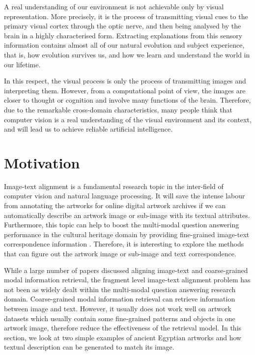 A real understanding of our environment is not achievable only by visual representation. More precisely, it is the process of transmitting visual cues to the primary visual cortex through the optic nerve, and then being analysed by the brain in a highly characterised form. Extracting explanations from this sensory information contains almost all of our natural evolution and subject experience, that is, how evolution survives us, and how we learn and understand the world in our lifetime.

In this respect, the visual process is only the process of transmitting images and interpreting them. However, from a computational point of view, the images are closer to thought or cognition and involve many functions of the brain. Therefore, due to the remarkable cross-domain characteristics, many people think that computer vision is a real understanding of the visual environment and its context, and will lead us to achieve reliable artificial intelligence.

\section{Motivation}
Image-text alignment is a fundamental research topic in the inter-field of computer vision and natural language processing. It will save the intense labour from annotating the artworks for online
digital artwork archives if we can automatically describe an artwork image or sub-image with its textual attributes. Furthermore, this topic can help to boost the multi-modal question answering performance in the cultural heritage domain by providing fine-grained image-text correspondence information \cite{mqa}. Therefore, it is interesting to explore the methods that can figure out the artwork image or sub-image and text correspondence.

While a large number of papers discussed aligning image-text and coarse-grained modal information retrieval, the fragment level image-text alignment problem has not been as widely dealt within the multi-modal question answering research domain. Coarse-grained modal information retrieval can retrieve information between image and text. However, it usually does not work well on artwork datasets which usually contain some fine-grained patterns and objects in one artwork image, therefore reduce the effectiveness of the retrieval model. In this section, we look at two simple examples of ancient Egyptian artworks and how textual description can be generated to match its image.

